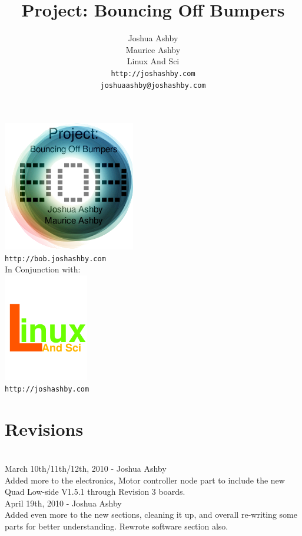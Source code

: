 \documentclass{article}
\begin{document}
\author{Joshua Ashby\\
        Maurice Ashby\\
        Linux And Sci\\
        \texttt{http://joshashby.com}\\
	\texttt{joshuaashby@joshashby.com}
}
\title{Project: Bouncing Off Bumpers}

  \begin{center}
\includegraphics{boblogo}\\
\texttt{http://bob.joshashby.com}\\

In Conjunction with:\\
\includegraphics{linuxandscilogo}\\
\texttt{http://joshashby.com}\\
  \end{center}

\maketitle

\newpage
\tableofcontents
\listoffigures
\renewcommand{\lstlistlistingname}{List of Programs}
\lstlistoflistings

\section{Revisions}\\
March 10th/11th/12th, 2010 - Joshua Ashby\\
Added more to the electronics, Motor controller node part to include the new Quad Low-side V1.5.1 through Revision 3 boards.\\
April 19th, 2010 - Joshua Ashby\\
Added even more to the new sections, cleaning it up, and overall re-writing some parts for better understanding. Rewrote software section also.\\
\end{document}
